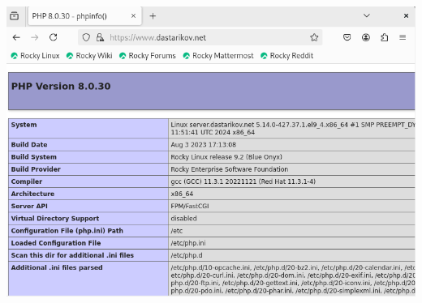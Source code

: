 \begin{enumerate}
\begin{center}
    \centering
    \includegraphics[width=\textwidth]{../images/image08.png}
    \label{08}
\end{center}

\end{enumerate}
